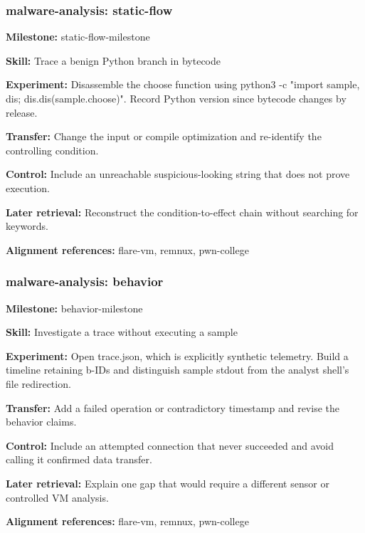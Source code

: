 \subsubsection{malware-analysis: static-flow}
\noindent\textbf{Milestone:} static-flow-milestone\par
\noindent\textbf{Skill:} Trace a benign Python branch in bytecode\par
\noindent\textbf{Experiment:} Disassemble the choose function using python3 -c "import sample, dis; dis.dis(sample.choose)". Record Python version since bytecode changes by release.\par
\noindent\textbf{Transfer:} Change the input or compile optimization and re-identify the controlling condition.\par
\noindent\textbf{Control:} Include an unreachable suspicious-looking string that does not prove execution.\par
\noindent\textbf{Later retrieval:} Reconstruct the condition-to-effect chain without searching for keywords.\par
\noindent\textbf{Alignment references:} flare-vm, remnux, pwn-college\par
\subsubsection{malware-analysis: behavior}
\noindent\textbf{Milestone:} behavior-milestone\par
\noindent\textbf{Skill:} Investigate a trace without executing a sample\par
\noindent\textbf{Experiment:} Open trace.json, which is explicitly synthetic telemetry. Build a timeline retaining b-IDs and distinguish sample stdout from the analyst shell’s file redirection.\par
\noindent\textbf{Transfer:} Add a failed operation or contradictory timestamp and revise the behavior claims.\par
\noindent\textbf{Control:} Include an attempted connection that never succeeded and avoid calling it confirmed data transfer.\par
\noindent\textbf{Later retrieval:} Explain one gap that would require a different sensor or controlled VM analysis.\par
\noindent\textbf{Alignment references:} flare-vm, remnux, pwn-college\par
